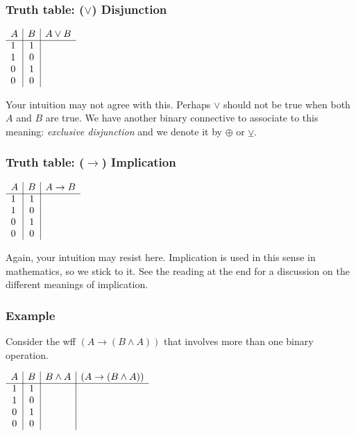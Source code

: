 \documentclass{beamer}
\theoremstyle{indentDefn} \newtheorem{defn}[]{Definition}
\begin{document}
\begin{frame}
	\frametitle{Truth table: ($\lor$) Disjunction}
	
	\begin{center}
		$\begin{array}{ l | c | r }			
		A & B & A \lor B\\
		\cline{1 - 3}
		1 & 1 & \\ 
		1 & 0 & \\
		0 & 1 & \\
		0 & 0 & 	
		\end{array}$
	\end{center}

	\pause
	\vspace{2cm}
	Your intuition may not agree with this. Perhaps $\lor$ should not be true when both $A$ and $B$ are true. We have another binary connective to associate to this meaning: \emph{exclusive disjunction} and we denote it by $\oplus$ or $\veebar$.

\end{frame}

\begin{frame}
	\frametitle{Truth table: ($\rightarrow$) Implication}
	
	\begin{center}
		$\begin{array}{ l | c | r }			
		A & B & A \rightarrow B\\
		\cline{1 - 3}
		1 & 1 & \\ 
		1 & 0 & \\
		0 & 1 & \\
		0 & 0 & 	
		\end{array}$
	\end{center}

	\pause
	\vspace{2cm}	
	Again, your intuition may resist here. Implication is used in this sense in mathematics, so we stick to it. See the reading at the end for a discussion on the different meanings of implication. 

\end{frame}

\begin{frame}
	\frametitle{Example}
	
	Consider the wff $(A\rightarrow(B \land A))$ that involves more than one binary operation. 
	
	\begin{center}
		$\begin{array}{ c | c | c | c }			
			A & B & B \land A & (A\rightarrow(B \land A))\\
			\cline{1 - 4}
			1 & 1 & & \\ 
			1 & 0 & &\\
			0 & 1 & &\\
			0 & 0 & &	
		\end{array}$
	\end{center}	
\end{frame}
\end{document}
